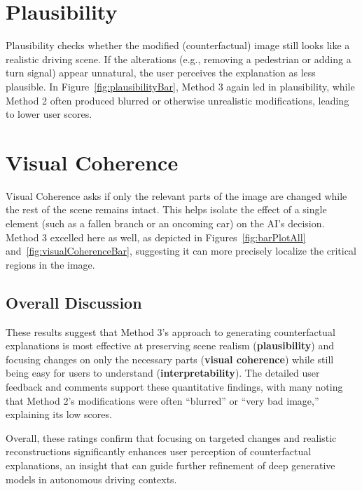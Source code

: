 \section{Plausibility}
\label{sec:plausibility}
Plausibility checks whether the modified (counterfactual) image still looks like a realistic driving scene. If the alterations 
(e.g., removing a pedestrian or adding a turn signal) appear unnatural, the user perceives the explanation as less plausible. 
In Figure~\ref{fig:plausibilityBar}, Method 3 again led in plausibility, while Method 2 often produced blurred or otherwise 
unrealistic modifications, leading to lower user scores.

\section{Visual Coherence}
\label{sec:visualcoherence}
Visual Coherence asks if only the relevant parts of the image are changed while the rest of the scene remains intact. 
This helps isolate the effect of a single element (such as a fallen branch or an oncoming car) on the AI's decision. 
Method 3 excelled here as well, as depicted in Figures~\ref{fig:barPlotAll} and~\ref{fig:visualCoherenceBar}, suggesting 
it can more precisely localize the critical regions in the image.

\subsection{Overall Discussion}
These results suggest that Method 3’s approach to generating counterfactual explanations is most effective at preserving 
scene realism (\textbf{plausibility}) and focusing changes on only the necessary parts (\textbf{visual coherence}) while 
still being easy for users to understand (\textbf{interpretability}). The detailed user feedback and comments support 
these quantitative findings, with many noting that Method 2’s modifications were often “blurred” or “very bad image,” 
explaining its low scores.

Overall, these ratings confirm that focusing on targeted changes and realistic reconstructions significantly enhances 
user perception of counterfactual explanations, an insight that can guide further refinement of deep generative models 
in autonomous driving contexts.